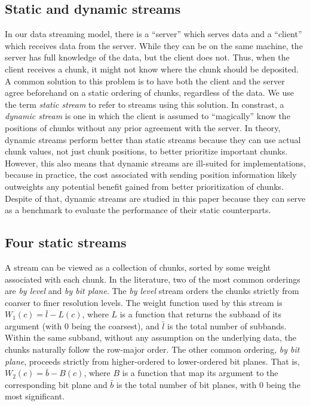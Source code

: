 \subsection{Static and dynamic streams}
\label{sec:static-dynamic-streams}

In our data streaming model, there is a ``server'' which serves data and a ``client'' which receives
data from the server. While they can be on the same machine, the server has full knowledge of the
data, but the client does not. Thus, when the client receives a chunk, it might not know where the
chunk should be deposited. A common solution to this problem is to have both the client and the
server agree beforehand on a static ordering of chunks, regardless of the data. We use the term
\emph{static stream} to refer to streams using this solution. In constrast, a \emph{dynamic stream}
is one in which the client is assumed to ``magically'' know the positions of chunks without any
prior agreement with the server. In theory, dynamic streams perform better than static streams
because they can use actual chunk values, not just chunk positions, to better prioritize important
chunks. However, this also means that dynamic streams are ill-suited for implementations, because in
practice, the cost associated with sending position information likely outweights any potential
benefit gained from better prioritization of chunks. Despite of that, dynamic streams are studied in
this paper because they can serve as a benchmark to evaluate the performance of their static
counterparts.

\subsection{Four static streams}
\label{sec:common-static-streams}

A stream can be viewed as a collection of chunks, sorted by some weight associated with each chunk.
In the literature, two of the most common orderings are \emph{by level} and \emph{by bit plane}. The
\emph{by level} stream orders the chunks strictly from coarser to finer resolution levels. The
weight function used by this stream is $W_1(c)=\bar{l}-L(c)$, where $L$ is a function that returns
the subband of its argument (with $0$ being the coarsest), and $\bar{l}$ is the total number of
subbands. Within the same subband, without any assumption on the underlying data, the chunks
naturally follow the row-major order. The other common ordering, \emph{by bit plane}, proceeds
strictly from higher-ordered to lower-ordered bit planes. That is, $W_2(c)=\bar{b}-B(c)$, where $B$
is a function that map its argument to the corresponding bit plane and $\bar{b}$ is the total number
of bit planes, with $0$ being the most significant.

